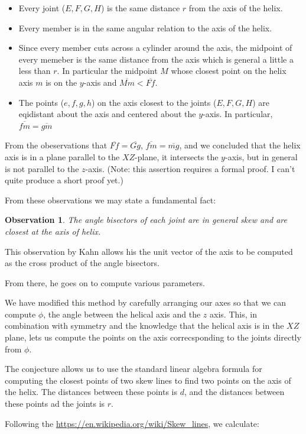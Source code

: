\documentclass[11pt]{article}
\newtheorem{observation}{Observation}
\begin{document}
{\begin{itemize}
\item Every joint ($E,F,G,H$) is the same distance $r$ from the axis of the helix.
\item Every member is in the same angular relation to the axis of the helix.
\item Since every member cuts across a cylinder around the axis,
  the midpoint of every memeber is the same distance from the axis
  which is general a little a less than $r$. In particular the midpoint $M$
  whose closest point on the helix axis $m$ is on the $y$-axis and
  $\overline{Mm} < \overline{Ff}$.
\item The points ($e,f,g,h$) on the axis closest to the joints ($E,F,G,H$)
  are eqidistant about the axis and centered about the $y$-axis. In
  particular, $\overline{fm} = \overline{gm}$
\end{itemize}

From the obeservations that $\overline{Ff} = \overline{Gg}$,
$\overline{fm} = \overline{mg} $, and
 we concluded that the helix axis is in a plane
parallel to the $XZ$-plane, it intersects the $y$-axis, but in general is
not parallel to the $z$-axis. (Note: this assertion requires a formal proof. I can't quite produce a short proof yet.)

From these observations we may state a fundamental fact:

\begin{observation}
  The angle bisectors of each joint are in general skew and are closest
  at the axis of helix.
\end{observation}

This observation by Kahn allows his the unit vector of the axis to
be computed as the cross product of the angle bisectors.

From there, he goes on to compute various parameters.

We have modified this method by carefully arranging our axes
so that we can compute $\phi$, the angle between the helical axis
and the $z$ axis. This, in combination with symmetry and the knowledge
that the helical axis is in the $XZ$ plane, lets us compute the
points on the axis correcsponding to the joints directly from $\phi$.

The conjecture allows us to use the standard linear algebra formula for
computing the closest points of two skew lines to find two points on the
axis of the helix. The distances between these points is $d$, and the
distances between these points ad the joints is $r$.

Following the \url{https://en.wikipedia.org/wiki/Skew_lines}, we calculate:

}
\end{document}
